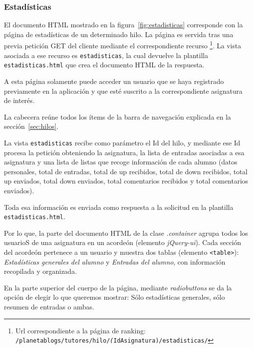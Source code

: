 \documentclass[a4paper, 12pt]{book}
\begin{document}
\subsubsection{Estad\'isticas} 
\label{sec:estadisticas}
El documento HTML mostrado en la figura~\ref{fig:estadisticas} corresponde con la p\'agina de estad\'isticas de un determinado hilo. 
La p\'agina es servida tras una previa petici\'on GET del cliente mediante el correspondiente recurso \footnote{Url correspondiente a la p\'agina de 
ranking: \texttt{/planetablogs/tutores/hilo/\textit(IdAsignatura)/estadisticas/}}. La vista asociada a ese recurso es \texttt{estadisticas}, la cual 
devuelve la plantilla \texttt{estadisticas.html} que crea el documento HTML de la respuesta.

A esta p\'agina solamente puede acceder un usuario que se haya registrado previamente en la aplicaci\'on y que est\'e suscrito a la
correspondiente asignatura de inter\'es.

La cabecera re\'une todos los \'items de la barra de navegaci\'on explicada en la secci\'on~\ref{sec:hilos}. 

La vista \texttt{estadisticas} recibe como par\'ametro el Id del hilo, y mediante ese Id procesa la petici\'on obteniendo la asignatura, la lista 
de entradas asociadas a esa asignatura y una lista de listas que recoge informaci\'on de cada alumno (datos personales, total de entradas, total de up 
recibidos, total de down recibidos, total up enviados, total down enviados, total comentarios recibidos y total comentarios enviados).

Toda esa informaci\'on es enviada como respuesta a la solicitud en la plantilla \texttt{estadisticas.html}. 

Por lo que, la parte del documento HTML de la clase \textit{.container} agrupa todos los usuarioS de una asignatura en un acorde\'on (elemento 
\textit{jQuery-ui}). Cada secci\'on del acorde\'on pertenece a un usuario y muestra dos tablas (elemento \texttt{<table>}): \textit{Estad\'isticas 
generales del alumno} y \textit{Entradas del alumno}, con informaci\'on recopilada y organizada. 

En la parte superior del cuerpo de la p\'agina, mediante \textit{radiobuttons} se da la opci\'on de elegir lo que queremos mostrar: S\'olo estad\'isticas 
generales, s\'olo resumen de entradas o ambas.
\end{document}

